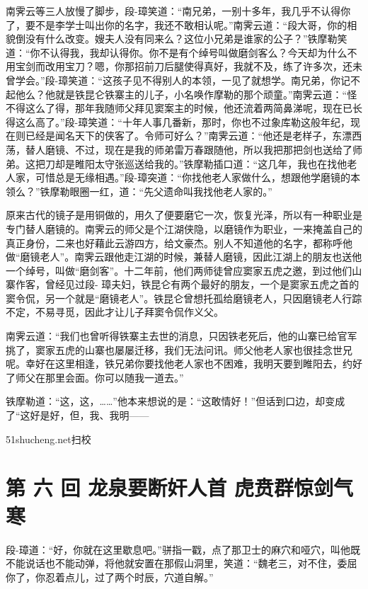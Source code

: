 \documentclass[12pt,oneside]{book}
\begin{document}
南霁云等三人放慢了脚步，段-璋笑道：``南兄弟，一别十多年，我几乎不认得你了，要不是李学士叫出你的名字，我还不敢相认呢。''南霁云道：``段大哥，你的相貌倒没有什么改变。嫂夫人没有同来么？这位小兄弟是谁家的公子？''铁摩勒笑道：``你不认得我，我却认得你。你不是有个绰号叫做磨剑客么？今天却为什么不用宝剑而改用宝刀？嗯，你那招前刀后腿使得真好，我就不及，练了许多次，还未曾学会。''段-璋笑道：``这孩子见不得别人的本领，一见了就想学。南兄弟，你记不起他么？他就是铁昆仑铁寨主的儿子，小名唤作摩勒的那个顽童。''南霁云道：``怪不得这么了得，那年我随师父拜见窦案主的时候，他还流着两简鼻涕呢，现在已长得这么高了。''段-璋笑道：``十年人事几番新，那时，你也不过象库勒这般年纪，现在则已经是闻名天下的侠客了。令师可好么？''南霁云道：``他还是老样子，东漂西荡，替人磨镜、不过，现在是我的师弟雷万春跟随他，所以我把那把剑也送给了师弟。这把刀却是睢阳太守张巡送给我的。''铁摩勒插口道：``这几年，我也在找他老人家，可惜总是无缘相遇。''段-璋突道：``你找他老人家做什么，想跟他学磨镜的本领么？''铁摩勒眼圈一红，道：``先父遗命叫我找他老人家的。''

原来古代的镜子是用铜做的，用久了便要磨它一次，恢复光泽，所以有一种职业是专门替人磨镜的。南霁云的师父是个江湖侠隐，以磨镜作为职业，一来掩盖自己的真正身份，二来也好藉此云游四方，给文豪杰。别人不知道他的名字，都称呼他做``磨镜老人''。南霁云跟他走江湖的时候，兼替人磨镜，因此江湖上的朋友也送他一个绰号，叫做``磨剑客''。十二年前，他们两师徒曾应窦家五虎之邀，到过他们山寨作客，曾经见过段-
璋夫妇，铁昆仑有两个最好的朋友，一个是窦家五虎之首的窦令侃，另一个就是``磨镜老人''。铁昆仑曾想托孤给磨镜老人，只因磨镜老人行踪不定，不易寻觅，因此才让儿子拜窦令侃作义父。

南霁云道：``我们也曾听得铁寨主去世的消息，只因铁老死后，他的山寨已给官军挑了，窦家五虎的山寨也屡屡迁移，我们无法问讯。师父他老人家也很挂念世兄呢。幸好在这里相逢，铁兄弟你要找他老人家也不困难，我明天要到睢阳去，约好了师父在那里会面。你可以随我一道去。''

铁摩勒道：``这，这，\ldots\ldots{}''他本来想说的是：``这敢情好！''但话到口边，却变成了``这好是好，但，我、我明------

51shucheng.net扫校

\chapter{第 六 回 龙泉要断奸人首
虎贲群惊剑气寒}\label{ux7b2c-ux516d-ux56de-ux9f99ux6cc9ux8981ux65adux5978ux4ebaux9996-ux864eux8d32ux7fa4ux60caux5251ux6c14ux5bd2}

段-璋道：``好，你就在这里歇息吧。''骈指一戳，点了那卫士的麻穴和哑穴，叫他既不能说话也不能动弹，将他就安置在那假山洞里，笑道：``魏老三，对不住，委屈你了，你忍着点儿，过了两个时辰，穴道自解。''
\end{document}
